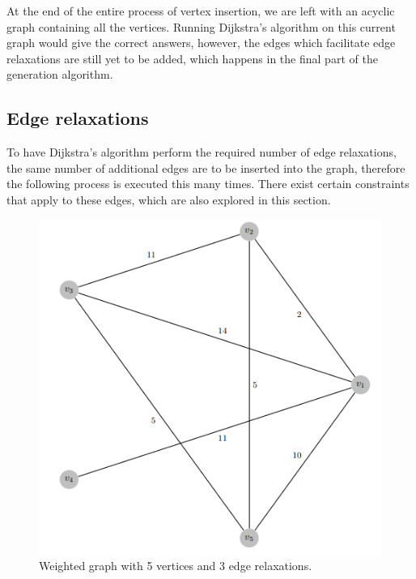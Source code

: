 \documentclass{l4proj}
\begin{document}
At the end of the entire process of vertex insertion, we are left with an acyclic graph containing all the vertices. Running Dijkstra's algorithm on this current graph would give the correct answers, however, the edges which facilitate edge relaxations are still yet to be added, which happens in the final part of the generation algorithm.

\subsection{Edge relaxations}
\label{sec:er}

To have Dijkstra's algorithm perform the required number of edge relaxations, the same number of additional edges are to be inserted into the graph, therefore the following process is executed this many times. There exist certain constraints that apply to these edges, which are also explored in this section.

\begin{figure}
    \centering
    \includegraphics[width=0.6\linewidth]{images/relaxWeight.png}    

    \caption{Weighted graph with 5 vertices and 3 edge relaxations.}
    \label{fig:relaxWeight} 
\end{figure}
\end{document}
